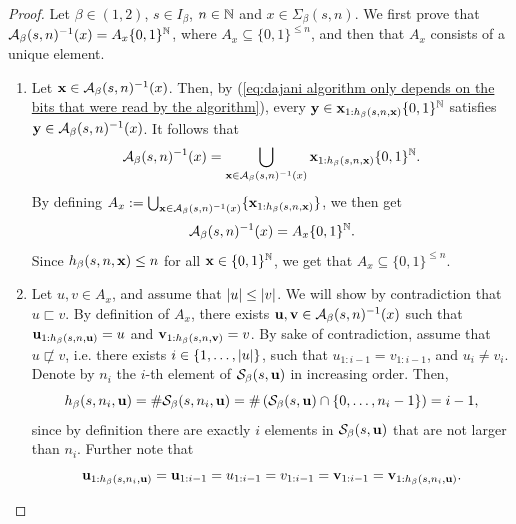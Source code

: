 \begin{proof}
    Let $\beta \in (1,2)$, $s \in I_\beta$, $n \in \mathbb{N}$ and $x \in \Sigma_\beta(s,n)$. We first prove that $\mathcal{A}_\beta(s,n)^{-1}(x) = A_x \{0,1\}^{\mathbb{N}}$, where $A_x \subseteq \{0,1\}^{\leq n}$, and then that $A_x$ consists of a unique element. 
    \begin{enumerate}[label = (\alph*)]
        \item Let ${\bf x} \in \mathcal{A}_\beta(s,n)^{-1}(x)$. Then, by (\ref{eq:dajani algorithm only depends on the bits that were read by the algorithm}), every ${\bf y} \in {\bf x}_{1:h_\beta(s,n,{\bf x})} \{0,1\}^{\mathbb{N}}$ satisfies ${\bf y} \in \mathcal{A}_\beta(s,n)^{-1}(x)$. It follows that
        \begin{equation}\label{eq:1:proof:lem:the set of preimages by the dajani algorithm is a cylinder}
            \mathcal{A}_\beta(s,n)^{-1}(x) = \bigcup_{{\bf x} \in \mathcal{A}_\beta(s,n)^{-1}(x)} {\bf x}_{1:h_\beta(s,n,{\bf x})} \{0,1\}^{\mathbb{N}}.
        \end{equation}
        By defining $A_x := \bigcup_{{\bf x} \in \mathcal{A}_\beta(s,n)^{-1}(x)} \{{\bf x}_{1:h_\beta(s,n,{\bf x})}\}$, we then get 
        \begin{equation}
            \mathcal{A}_\beta(s,n)^{-1}(x) = A_x \{0,1\}^{\mathbb{N}}.
        \end{equation}
        Since $h_\beta(s,n,{\bf x}) \leq n$ for all ${\bf x} \in \{0,1\}^{\mathbb{N}}$, we get that $A_x \subseteq \{0,1\}^{\leq n}$.
        \item Let $u, v \in A_x$, and assume that $\left| u \right| \leq \left| v \right|$. We will show by contradiction that $u \sqsubset v$. By definition of $A_x$, there exists ${\bf u},{\bf v} \in \mathcal{A}_\beta(s,n)^{-1}(x)$ such that ${\bf u}_{1:h_\beta(s,n,{\bf u})} = u$ and ${\bf v}_{1:h_\beta(s,n,{\bf v})} = v$. By sake of contradiction, assume that $u \not\sqsubset v$, i.e. there exists $i \in \{1,\ldots, \left| u \right|\}$, such that $u_{1:i-1} = v_{1:i-1}$, and $u_i \neq v_i$. Denote by $n_i$ the $i$-th element of $\mathcal{S}_\beta(s,{\bf u})$ in increasing order. Then,
        \begin{equation}
            h_\beta(s,n_i,{\bf u}) = \#\mathcal{S}_\beta(s,n_i,{\bf u}) = \# \left(\mathcal{S}_\beta(s,{\bf u}) \cap \{0, \ldots, n_i-1\} \right) = i-1,
        \end{equation}
        since by definition there are exactly $i$ elements in $\mathcal{S}_\beta(s,{\bf u})$ that are not larger than $n_i$. Further note that
        \begin{equation}
            {\bf u}_{1:h_\beta(s,n_i,{\bf u})} = {\bf u}_{1:i-1} = u_{1:i-1} = v_{1:i-1} = {\bf v}_{1:i-1} = {\bf v}_{1:h_\beta(s,n_i,{\bf u})}.
        \end{equation}

\end{enumerate}
\end{proof}
